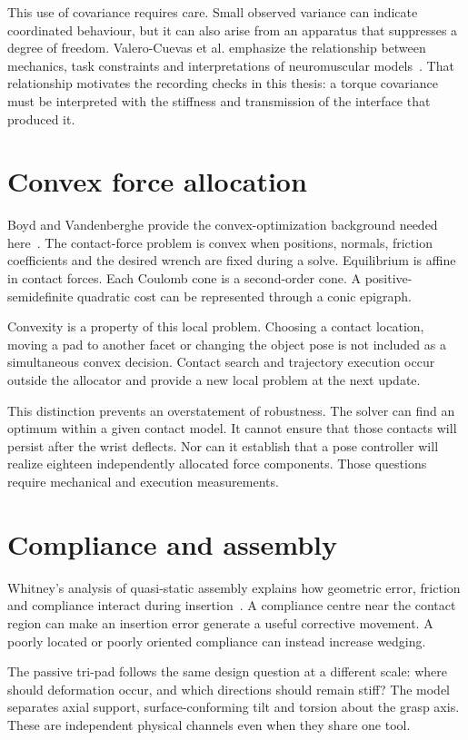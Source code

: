This use of covariance requires care. Small observed variance can indicate coordinated behaviour, but it can also arise from an apparatus that suppresses a degree of freedom. Valero-Cuevas et al. emphasize the relationship between mechanics, task constraints and interpretations of neuromuscular models~\cite{valero2009}. That relationship motivates the recording checks in this thesis: a torque covariance must be interpreted with the stiffness and transmission of the interface that produced it.

\section{Convex force allocation}

Boyd and Vandenberghe provide the convex-optimization background needed here~\cite{boyd2004}. The contact-force problem is convex when positions, normals, friction coefficients and the desired wrench are fixed during a solve. Equilibrium is affine in contact forces. Each Coulomb cone is a second-order cone. A positive-semidefinite quadratic cost can be represented through a conic epigraph.

Convexity is a property of this local problem. Choosing a contact location, moving a pad to another facet or changing the object pose is not included as a simultaneous convex decision. Contact search and trajectory execution occur outside the allocator and provide a new local problem at the next update.

This distinction prevents an overstatement of robustness. The solver can find an optimum within a given contact model. It cannot ensure that those contacts will persist after the wrist deflects. Nor can it establish that a pose controller will realize eighteen independently allocated force components. Those questions require mechanical and execution measurements.

\section{Compliance and assembly}

Whitney's analysis of quasi-static assembly explains how geometric error, friction and compliance interact during insertion~\cite{whitney1982}. A compliance centre near the contact region can make an insertion error generate a useful corrective movement. A poorly located or poorly oriented compliance can instead increase wedging.

The passive tri-pad follows the same design question at a different scale: where should deformation occur, and which directions should remain stiff? The model separates axial support, surface-conforming tilt and torsion about the grasp axis. These are independent physical channels even when they share one tool.


